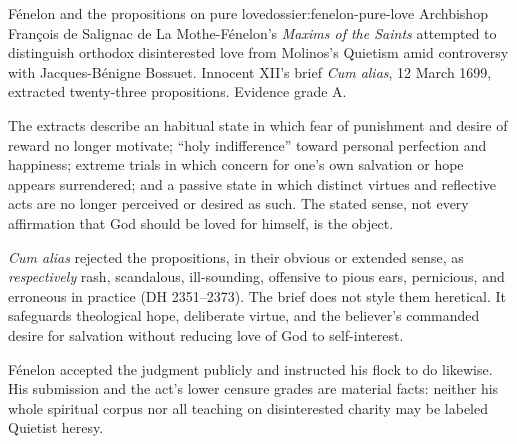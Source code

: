 \begin{heresydossier}{F\'enelon and the propositions on pure love}{dossier:fenelon-pure-love}
\objectfield Archbishop Fran\c{c}ois de Salignac de La Mothe-F\'enelon's \emph{Maxims of the Saints} attempted to distinguish orthodox disinterested love from Molinos's Quietism amid controversy with Jacques-B\'enigne Bossuet. Innocent XII's brief \emph{Cum alias}, 12 March 1699, extracted twenty-three propositions. Evidence grade A.

\propositionfield The extracts describe an habitual state in which fear of punishment and desire of reward no longer motivate; ``holy indifference'' toward personal perfection and happiness; extreme trials in which concern for one's own salvation or hope appears surrendered; and a passive state in which distinct virtues and reflective acts are no longer perceived or desired as such. The stated sense, not every affirmation that God should be loved for himself, is the object.

\responsefield \emph{Cum alias} rejected the propositions, in their obvious or extended sense, as \emph{respectively} rash, scandalous, ill-sounding, offensive to pious ears, pernicious, and erroneous in practice (DH 2351--2373). The brief does not style them heretical. It safeguards theological hope, deliberate virtue, and the believer's commanded desire for salvation without reducing love of God to self-interest.

\aftermathfield F\'enelon accepted the judgment publicly and instructed his flock to do likewise. His submission and the act's lower censure grades are material facts: neither his whole spiritual corpus nor all teaching on disinterested charity may be labeled Quietist heresy.
\end{heresydossier}

